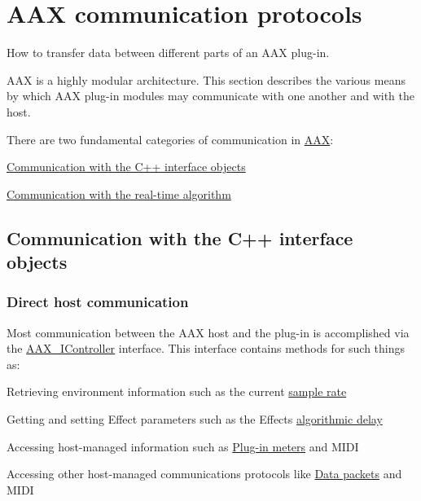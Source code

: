 \hypertarget{a00330}{}\section{A\+A\+X communication protocols}
\label{a00330}
How to transfer data between different parts of an A\+A\+X plug-\/in. 

A\+A\+X is a highly modular architecture. This section describes the various means by which A\+A\+X plug-\/in modules may communicate with one another and with the host.

There are two fundamental categories of communication in \hyperlink{a00288}{A\+A\+X}\+:
\begin{DoxyEnumerate}
\item \hyperlink{a00330_CommonInterface_Communication_hostmodules}{Communication with the C++ interface objects}
\item \hyperlink{a00330_CommonInterface_Communication_algorithm}{Communication with the real-\/time algorithm}
\end{DoxyEnumerate}\hypertarget{a00330_CommonInterface_Communication_hostmodules}{}\subsection{Communication with the C++ interface objects}\label{a00330_CommonInterface_Communication_hostmodules}
\hypertarget{a00330_CommonInterface_Communication_hostmodules_controller}{}\subsubsection{Direct host communication}\label{a00330_CommonInterface_Communication_hostmodules_controller}
Most communication between the A\+A\+X host and the plug-\/in is accomplished via the \hyperlink{a00090}{A\+A\+X\+\_\+\+I\+Controller} interface. This interface contains methods for such things as\+:
\begin{DoxyItemize}
\item Retrieving environment information such as the current \hyperlink{a00090_afa1f9f64eeeab9570e5599f466fa699e}{sample rate}
\item Getting and setting Effect parameters such as the Effect\textquotesingle{}s \hyperlink{a00090_ad50aa6fd54e39623a58debd63d9551e1}{algorithmic delay}
\item Accessing host-\/managed information such as \hyperlink{a00337}{Plug-\/in meters} and M\+I\+D\+I
\item Accessing other host-\/managed communications protocols like \hyperlink{a00330_CommonInterface_Communication_algorithm_datapackets}{Data packets} and M\+I\+D\+I
\end{DoxyItemize}

